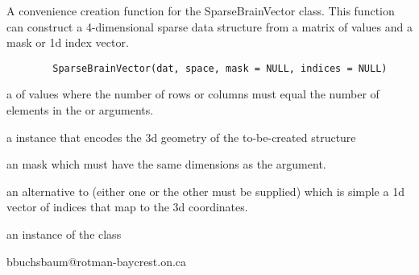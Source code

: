 \begin{Description}\relax
A convenience creation function for the SparseBrainVector class.  
This function can construct a 4-dimensional sparse data structure from a matrix of values and a mask or 1d index vector.
\end{Description}
\begin{Usage}
\begin{verbatim}
        SparseBrainVector(dat, space, mask = NULL, indices = NULL)
\end{verbatim}
\end{Usage}
\begin{Arguments}
\begin{ldescription}
\item[\code{dat}] a  of values where the number of rows or columns must equal the number of elements in the  or  arguments.


\item[\code{space}] a  instance that encodes the 3d geometry of the to-be-created structure


\item[\code{mask}] an mask which must have the same dimensions as the  argument.


\item[\code{indices}] an alternative to  (either one or the other must be supplied) which is simple a 1d vector of indices that map to the 3d coordinates.

\end{ldescription}
\end{Arguments}
\begin{Value}
an instance of the  class
\end{Value}
\begin{Author}\relax
bbuchsbaum@rotman-baycrest.on.ca
\end{Author}

